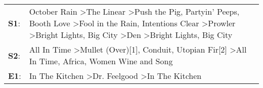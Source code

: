 \begin{supertabular}{p{0.03\textwidth}p{0.92\textwidth}}
 \textbf{S1}:  &  October Rain\textsuperscript{} \textgreater \enspace The Linear\textsuperscript{} \textgreater \enspace Push the Pig\textsuperscript{}, \enspace Partyin' Peeps\textsuperscript{}, \enspace Booth Love\textsuperscript{} \textgreater \enspace Fool in the Rain\textsuperscript{}, \enspace Intentions Clear\textsuperscript{} \textgreater \enspace Prowler\textsuperscript{} \textgreater \enspace Bright Lights, Big City\textsuperscript{} \textgreater \enspace Den\textsuperscript{} \textgreater \enspace Bright Lights, Big City\textsuperscript{}  \enspace  \\
 \textbf{S2}:  &                                                                                                                                                                                                                                                All In Time\textsuperscript{} \textgreater \enspace Mullet (Over)[1]\textsuperscript{}, \enspace Conduit\textsuperscript{}, \enspace Utopian Fir[2]\textsuperscript{} \textgreater \enspace All In Time\textsuperscript{}, \enspace Africa\textsuperscript{}, \enspace Women Wine and Song\textsuperscript{}  \enspace  \\
 \textbf{E1}:  &                                                                                                                                                                                                                                                                                                                                                                                                                In The Kitchen\textsuperscript{} \textgreater \enspace Dr. Feelgood\textsuperscript{} \textgreater \enspace In The Kitchen\textsuperscript{}  \enspace  \\
\end{supertabular}
